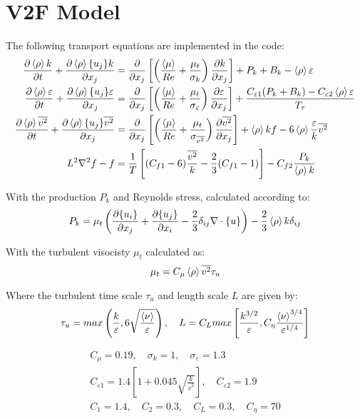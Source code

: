 \section{V2F Model}
The following transport equations are implemented in the code:
\begin{equation} \label{eq:ktDeng}
\begin{split}
\frac{\partial \left<{\rho}\right> k }{\partial {t}} + \frac{\partial \left<{\rho}\right>\{{u_j}\}k}{\partial {x_j}} &= \frac{\partial}{\partial x_j}\left[\left(\frac{\left<{\mu}\right>}{Re} + \frac{\mu_t}{\sigma_k}\right)\frac{\partial k}{\partial {x_j}}\right] + P_{k} + B_k- \left<{\rho}\right>\varepsilon \\
\frac{\partial \left<{\rho}\right> \varepsilon}{\partial {t}} + \frac{\partial \left<{\rho}\right> \{{u_j}\} \varepsilon}{\partial {x_j}} &= \frac{\partial}{\partial x_j}\left[ \left(\frac{\left<{\mu}\right>}{Re} + \frac{\mu_t}{\sigma_{\varepsilon}}\right)\frac{\partial \varepsilon}{\partial {x_j}}\right] + \frac{C_{\varepsilon1}(P_k+B_k)  -C_{\varepsilon2} \left<{\rho}\right> \varepsilon}{T_\tau}   \\
\frac{\partial  \left<{\rho}\right> \overline{v^2}}{\partial {t}} + \frac{\partial  \left<{\rho}\right> \{{u_j}\} \overline{v^2}}{\partial {x_j}}           &= \frac{\partial}{\partial x_j}\left[ \left(\frac{\left<{\mu}\right>}{Re} + \frac{\mu_t}{\sigma_{\overline{v^2}}}\right)\frac{\partial \overline{v^2}}{\partial {x_j}}\right] + \left<{\rho}\right> k f - 6\left<{\rho}\right> \frac{\varepsilon}{k}\overline{v^2} \\
L^2\nabla^2 f -f &= \frac{1}{T}\left[(C_{f1}-6)\frac{\overline{v^2}}{k}-\frac{2}{3}(C_{f1}-1)\right]-C_{f2}\frac{P_k}{\left<{\rho}\right> k}
\end{split}
\end{equation}

With the production $P_k$ and Reynolds stress, calculated according to:
\begin{equation}
P_k = \mu_t \left(\frac{\partial \{{u_i}\}}{\partial {x_j}} +\frac{\partial \{{u_j}\}}{\partial {x_i}} - \frac{2}{3}\delta_{ij} \nabla \cdot \{{u}\} \right) - \frac{2}{3} \left<{\rho}\right> k \delta_{ij}
\end{equation}

With the turbulent visocisty $\mu_t$ calculated as:
\begin{equation}
\mu_t = C_\mu \left<{\rho}\right> \overline{v^2} \tau_u
\end{equation}

Where the turbulent time scale $\tau_u$ and length scale $L$ are given by:
\begin{equation}
\tau_u = max\left(\frac{k}{\varepsilon},6\sqrt{\frac{\left<{\nu}\right>}{\varepsilon}}\right), \quad L = C_L max\left[\frac{k^{3/2}}{\varepsilon},C_\eta\frac{\left<{\nu}\right>^{3/4}}{\varepsilon^{1/4}}\right]
\end{equation}

\begin{equation}
\begin{split}
C_\mu = 0.19,\quad  \sigma_k = 1, \quad \sigma_\varepsilon =1.3 \\
C_{\varepsilon1} = 1.4\left[1+0.045\sqrt{\frac{k}{\overline{v}^2}}\right], \quad C_{\varepsilon2} = 1.9 \\
C_1 = 1.4, \quad C_2 = 0.3, \quad C_L=0.3, \quad C_\eta = 70
\end{split}
\end{equation}

